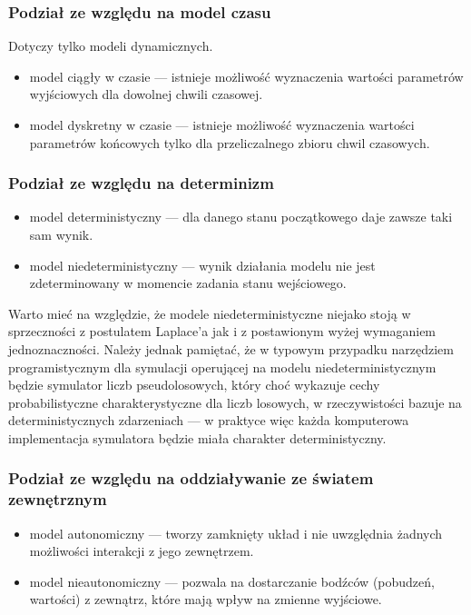 \subsubsection{Podział ze względu na model czasu}
\par{
Dotyczy tylko modeli dynamicznych.
\begin{itemize}
\item model ciągły w czasie --- istnieje możliwość wyznaczenia wartości parametrów wyjściowych dla dowolnej chwili czasowej.
\item model dyskretny w czasie --- istnieje możliwość wyznaczenia wartości parametrów końcowych tylko dla przeliczalnego zbioru chwil czasowych.
\end{itemize}
}

\subsubsection{Podział ze względu na determinizm}
\par{
\begin{itemize}
\item model deterministyczny --- dla danego stanu początkowego daje zawsze taki sam wynik.
\item model niedeterministyczny --- wynik działania modelu nie jest zdeterminowany w momencie zadania stanu wejściowego.
\end{itemize}
}
\par{
Warto mieć na względzie, że modele niedeterministyczne niejako stoją w sprzeczności z postulatem Laplace'a jak i z postawionym wyżej wymaganiem jednoznaczności. Należy jednak pamiętać, że w typowym przypadku narzędziem programistycznym dla symulacji operującej na modelu niedeterministycznym będzie symulator liczb pseudolosowych, który choć wykazuje cechy probabilistyczne charakterystyczne dla liczb losowych, w rzeczywistości bazuje na deterministycznych zdarzeniach --- w praktyce więc każda komputerowa implementacja symulatora będzie miała charakter deterministyczny.
}

\subsubsection{Podział ze względu na oddziaływanie ze światem zewnętrznym}
\par{
\begin{itemize}
\item model autonomiczny --- tworzy zamknięty układ i nie uwzględnia żadnych możliwości interakcji z jego zewnętrzem.
\item model nieautonomiczny --- pozwala na dostarczanie bodźców (pobudzeń, wartości) z zewnątrz, które mają wpływ na zmienne wyjściowe.
\end{itemize}
}

